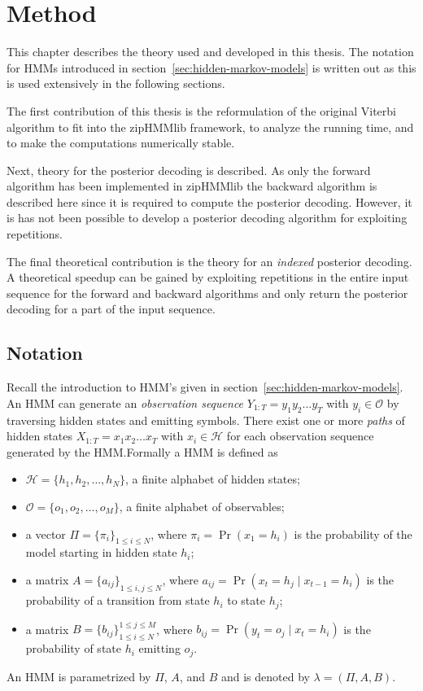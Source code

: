 \chapter{Method}
\label{cha:method}

This chapter describes the theory used and developed in this thesis. The
notation for HMMs introduced in section~\ref{sec:hidden-markov-models} is
written out as this is used extensively in the following sections.

The first contribution of this thesis is the reformulation of the original
Viterbi algorithm to fit into the zipHMMlib framework, to analyze the running
time, and to make the computations numerically stable.

Next, theory for the posterior decoding is described. As only the forward
algorithm has been implemented in zipHMMlib the backward algorithm is described
here since it is required to compute the posterior decoding. However, it is has
not been possible to develop a posterior decoding algorithm for exploiting repetitions.

The final theoretical contribution is the theory for an \emph{indexed}
posterior decoding. A theoretical speedup can be gained by exploiting
repetitions in the entire input sequence for the forward and backward
algorithms and only return the posterior decoding for a part of the input
sequence.

\section{Notation}

Recall the introduction to HMM's given in
section~\ref{sec:hidden-markov-models}. An HMM can generate an
\emph{observation sequence} $Y_{1:T} = y_1y_2\dots{}y_T$ with
$y_i \in \mathcal{O}$ by traversing hidden states and emitting symbols. There
exist one or more \emph{paths} of hidden states $X_{1:T} = x_1x_2\dots{}x_T$
with $x_i \in \mathcal{H}$ for each observation sequence generated by the
HMM.\@ Formally a HMM is defined as
\begin{itemize}
\item $\mathcal{H} = \{h_1, h_2, \dots, h_N\}$, a finite alphabet of hidden
  states;
\item $\mathcal{O} = \{o_1, o_2, \dots, o_M\}$, a finite alphabet of observables;
\item a vector $\Pi = {\{\pi_i\}}_{1 \le i \le N}$, where $\pi_i = \Pr(x_1 =
  h_i)$ is the probability of the model starting in hidden state $h_i$;
\item a matrix $A = {\{a_{ij}\}}_{1 \le i,j \le N}$, where $a_{ij} = \Pr(x_t
  = h_j \mid x_{t - 1} = h_i)$ is the probability of a transition from state
  $h_i$ to state $h_j$;
\item a matrix $B = {\{b_{ij}\}}_{1 \le i \le N}^{1 \le j \le M}$, where
  $b_{ij} = \Pr(y_t = o_j \mid x_t = h_i)$ is the probability of state
  $h_i$ emitting $o_j$.
\end{itemize}
An HMM is parametrized by $\Pi$, $A$, and $B$ and is denoted by $\lambda =
(\Pi, A, B)$.

